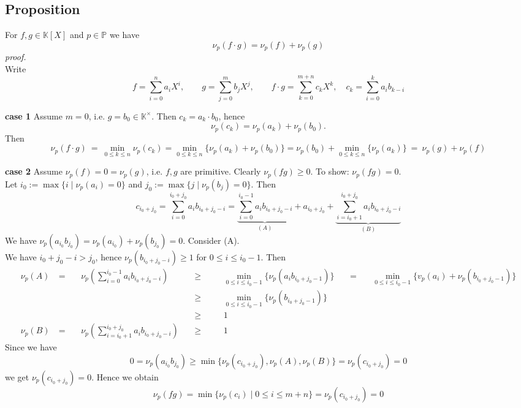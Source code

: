 \documentclass[12pt]{book}
\begin{document}
\begin{spacing}{1.3}
\subsection{Proposition} %
For $f,g \in \mathbb{K}[X]$ and $p \in \mathbb{P}$ we have 
$$\nu_p(f\cdot g)=\nu_p(f) + \nu_p(g)$$
\textit{proof.}\\
Write 
$$f=\sum_{i=0}^n a_i X^{i}, \qquad g=\sum_{j=0}^m b_j X^{j}, \qquad f \cdot g = \sum_{k=0}^{m+n}c_k X^{k}, \quad c_k=\sum_{i=0}^k a_i b_{k-i}$$
\begin{compactitem}
\item[\textbf{case 1}] Assume $m=0$, i.e. $g=b_0 \in \mathbb{K}^{\times}$. Then $c_k=a_k \cdot b_0$, hence 
$$\nu_p(c_k)=\nu_p(a_k) + \nu_p(b_0).$$
Then
$$\nu_p(f \cdot g) \  = \ \min_{0\leqslant k \leqslant n} \nu_p(c_k)=\min_{0 \leqslant k \leqslant n}\{\nu_p(a_k)+\nu_p(b_0)\}=\nu_p(b_0)+\min_{0\leqslant k \leqslant n}\{\nu_p(a_k)\}\ = \ \nu_p(g)+\nu_p(f)$$
\item[\textbf{case 2}] Assume $\nu_p(f)=0=\nu_p(g)$, i.e. $f,g$ are primitive. Clearly $\nu_p(fg)\geqslant 0$. To show: $\nu_p(fg)=0$.\\
Let $i_0:=\max\{i \mid \nu_p(a_i)=0\}$ and $j_0:= \max\{j \mid \nu_p(b_j)=0\}$. Then
$$c_{i_0+j_0}=\sum_{i=0}^{i_0+j_0}a_i b_{i_0+j_0-i}=\underbrace{\sum_{i=0}^{i_0-1} a_i b_{i_0+j_0-i}}_{(A)} + a_{i_0+j_0}+ \underbrace{\sum_{i=i_0+1}^{i_0+j_0} a_i b_{i_0+j_0-i}}_{(B)}$$
We have $\nu_p(a_{i_0}b_{j_0})=\nu_p(a_{i_0})+\nu_p(b_{j_0})=0$. Consider (A).\\
We have $i_0+j_0-i>j_0$, hence $\nu_p(b_{i_0+j_0-i}) \geqslant 1$ for $0 \leqslant i \leqslant i_0-1$. Then 
\begin{alignat*}{11}
\nu_p(A)\ &=&&\ \nu_p\left(\sum_{i=0}^{i_0-1}a_i b_{i_0+j_0-i}\right) \quad &&\geqslant && \quad \min_{0 \leqslant i \leqslant i_0-1} \{\nu_p(a_ib_{i_0+j_0-1})\} \ &&=&& \ \min_{0 \leqslant i \leqslant i_0-1} \{v_p(a_i)+\nu_p(b_{i_0+j_0-1})\}\\
&&&\quad &&\geqslant&&\quad \min_{0 \leqslant i \leqslant i_0-1}\{\nu_p(b_{i_0+j_0-1})\}\\
&&&&&\geqslant&& \quad 1\\
\nu_p(B)\ &=&&\ \nu_p\left(\sum_{i=i_0+1}^{i_0+j_0} a_i b_{i_0+j_0-i}\right) \ &&\geqslant&& \quad 1
\end{alignat*}
Since we have 
$$0=\nu_p(a_{i_0}b_{j_0})\geqslant \min\{\nu_p(c_{i_0+j_0}), \nu_p(A), \nu_p(B)\}=\nu_p(c_{i_0+j_0})=0$$
we get $\nu_p(c_{i_0+j_0})=0$. Hence we obtain
$$\nu_p(fg)=\min\{\nu_p(c_i) \mid 0 \leqslant i \leqslant m+n \}=\nu_p(c_{i_0+j_0})=0$$

\end{compactitem}
\end{spacing}
\end{document}
